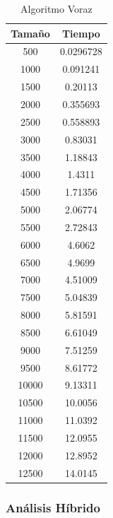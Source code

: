 \documentclass[a4paper,12pt,twoside]{article} %
\begin{document}
\begin{table}[h]
	\begin{center}
		\begin{tabular}{|c|c|}
		\hline
		Tamaño & Tiempo \\
		\hline
		500 & 0.0296728 \\
		1000 & 0.091241 \\
		1500 & 0.20113 \\
		2000 & 0.355693 \\
		2500 & 0.558893 \\
		3000 & 0.83031 \\
		3500 & 1.18843 \\
		4000 & 1.4311 \\
		4500 & 1.71356 \\
		5000 & 2.06774 \\
		5500 & 2.72843 \\
		6000 & 4.6062 \\
		6500 & 4.9699 \\
		7000 & 4.51009 \\
		7500 & 5.04839 \\
		8000 & 5.81591 \\
		8500 & 6.61049 \\
		9000 & 7.51259 \\
		9500 & 8.61772 \\
		10000 & 9.13311 \\
		10500 & 10.0056 \\
		11000 & 11.0392 \\
		11500 & 12.0955 \\
		12000 & 12.8952 \\
		12500 & 14.0145 \\
		\hline
		\end{tabular}
	\end{center}
	\caption{Algoritmo Voraz}
\end{table}

\newpage


\subsubsection{Análisis Híbrido}
\end{document}
